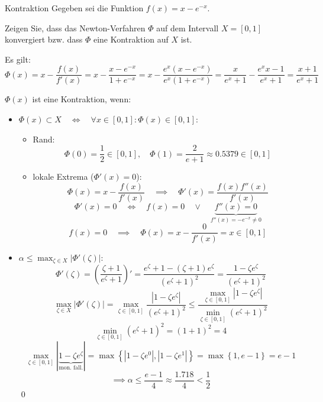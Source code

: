 \begin{example}{Kontraktion}
    Gegeben sei die Funktion $f(x) = x - e^{-x}$. 
    
    Zeigen Sie, dass das Newton-Verfahren $\Phi$ auf dem Intervall $X = [0, 1]$ konvergiert bzw. dass $\Phi$ eine Kontraktion auf $X$ ist.
    
    \exampleseparator
    
    Es gilt: 
    \[ 
        \Phi(x) = x - \frac{f(x)}{f'(x)} = x - \frac{x - e^{-x}}{1 + e^{-x}} = x - \frac{e^x \left(x - e^{-x}\right)}{e^x \left(1 + e^{-x}\right)} = \frac{x}{e^x + 1} - \frac{e^xx - 1}{e^x + 1} = \frac{x+1}{e^x + 1}
    \]
    
    $\Phi(x)$ ist eine Kontraktion, wenn: 
    \begin{itemize}
        \item $\Phi(x) \subset X \quad \iff \quad \forall x \in [0, 1]: \Phi(x) \in [0, 1]$:
              \begin{itemize}
                  \item Rand:
                        \[ \Phi(0) = \frac{1}{2} \in [0, 1], \quad \Phi(1) = \frac{2}{e + 1} \approx 0.5379 \in [0, 1] \]
                  \item lokale Extrema ($\Phi'(x) = 0$):
                        \[ 
                            \Phi(x) = x - \frac{f(x)}{f'(x)} \quad \implies \quad \Phi'(x) = \frac{f(x) f''(x)}{f'(x)}
                        \]
                        \[ 
                            \Phi'(x) = 0 \quad \iff \quad f(x) = 0 \quad \lor \quad \underbrace{f''(x) = 0}_{f''(x) = -e^{-x} \neq 0}
                        \]
                        \[ 
                            f(x) = 0 \quad \implies \quad \Phi(x) = x - \frac{0}{f'(x)} = x \in [0, 1]
                        \]
              \end{itemize}
        \item $\displaystyle \alpha \leq \max_{\zeta \in X} |\Phi'(\zeta)|$:
              \[ 
                  \Phi'(\zeta) = \left(\frac{\zeta+1}{e^\zeta + 1}\right)' = \frac{e^\zeta + 1 - (\zeta + 1) e^\zeta}{(e^\zeta + 1)^2} = \frac{1 - \zeta e^\zeta}{(e^\zeta + 1)^2}
              \]
              \[ 
                  \max_{\zeta \in X} |\Phi'(\zeta)| = \max_{\zeta \in [0, 1]} \frac{|1 - \zeta e^\zeta|}{(e^\zeta + 1)^2} \leq \frac{\displaystyle \max_{\zeta \in [0, 1]} |1 - \zeta e^\zeta|}{\displaystyle \min_{\zeta \in [0, 1]} (e^\zeta + 1)^2}
              \]
              \[ 
                  \displaystyle \min_{\zeta \in [0, 1]} (e^\zeta + 1)^2 = (1 + 1)^2 = 4
              \]
              \[ 
                  \displaystyle \max_{\zeta \in [0, 1]} |\underbrace{1 - \zeta e^\zeta}_{\text{mon. fall.}}| = \max \left\{ |1 - \zeta e^0|, |1 - \zeta e^1| \right\} = \max \left\{ 1, e-1 \right\} = e-1
              \]
              \[ 
                  \implies \alpha \leq \frac{e-1}{4} \approx \frac{1.718}{4} < \frac{1}{2}
              \]
              \qed
    \end{itemize}
\end{example}

